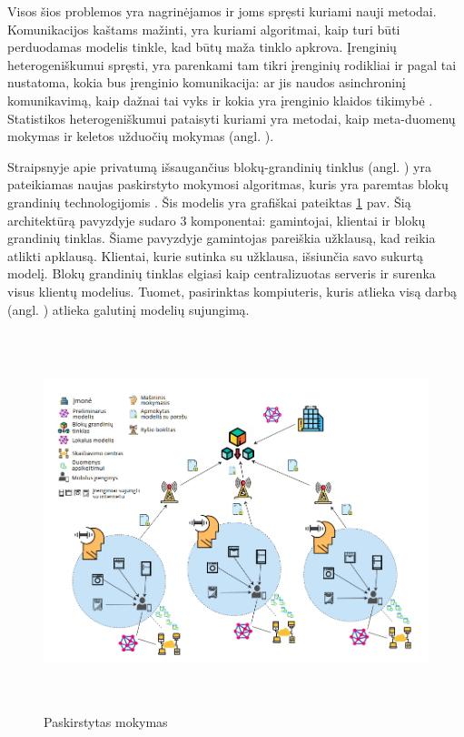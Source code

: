 \documentclass{VUMIFInfBakalaurinis}
\begin{document}
	\par Visos šios problemos yra nagrinėjamos ir joms spręsti kuriami nauji metodai. Komunikacijos kaštams mažinti, yra kuriami algoritmai, kaip turi būti perduodamas modelis tinkle, kad būtų maža tinklo apkrova. Įrenginių heterogeniškumui spręsti, yra parenkami tam tikri įrenginių rodikliai ir pagal tai nustatoma, kokia bus įrenginio komunikacija: ar jis naudos asinchroninį komunikavimą, kaip dažnai tai vyks ir kokia yra įrenginio klaidos tikimybė \cite{4}. Statistikos heterogeniškumui pataisyti kuriami yra metodai, kaip meta-duomenų mokymas ir keletos užduočių mokymas (angl. ). 
	\par Straipsnyje apie privatumą išsaugančius blokų-grandinių tinklus (angl. ) yra pateikiamas naujas paskirstyto mokymosi algoritmas, kuris yra paremtas
blokų grandinių technologijomis \cite{5}. Šis modelis yra grafiškai pateiktas \ref{fig:overflowProblem} pav. Šią architektūrą pavyzdyje sudaro 3 komponentai: gamintojai, klientai ir blokų grandinių tinklas. Šiame pavyzdyje gamintojas pareiškia užklausą, kad reikia atlikti apklausą. Klientai, kurie sutinka su užklausa, išsiunčia savo sukurtą modelį. Blokų grandinių tinklas elgiasi kaip centralizuotas serveris ir surenka visus klientų modelius. Tuomet, pasirinktas kompiuteris, kuris atlieka visą darbą (angl. ) atlieka galutinį modelių sujungimą.

\begin{figure}[ht]
  \centering
  \includegraphics[width=13cm,height=11cm,keepaspectratio]{img/paskirstytasMokymasis.png}
  \caption{Paskirstytas mokymas \cite{5}}
  \label{fig:overflowProblem}
\end{figure}
\end{document}
